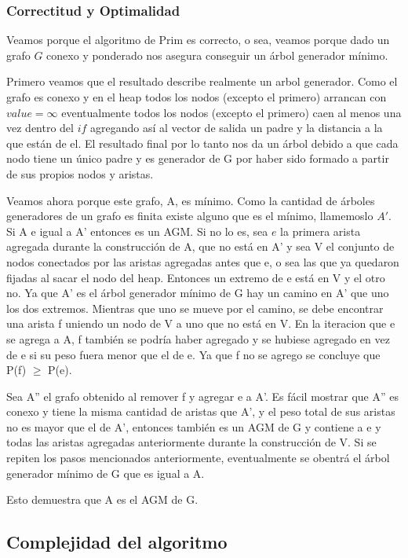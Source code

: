 \subsubsection{Correctitud y Optimalidad}

Veamos porque el algoritmo de Prim es correcto, o sea, veamos porque dado un grafo $G$ conexo y ponderado nos asegura conseguir un árbol generador mínimo.

Primero veamos que el resultado describe realmente un arbol generador. Como el grafo es conexo y en el heap todos los nodos (excepto el primero) arrancan con $value = \infty$  eventualmente todos los nodos (excepto el primero) caen al menos una vez dentro del $if$ agregando así al vector de salida un padre y la distancia a la que están de el. El resultado final por lo tanto nos da un árbol debido a que cada nodo tiene un único padre y es generador de G por haber sido formado a partir de sus propios nodos y aristas.

Veamos ahora porque este grafo, A, es mínimo. Como la cantidad de árboles generadores de un grafo es finita existe alguno que es el mínimo, llamemoslo $A'$. Si A e igual a A' entonces es un AGM. Si no lo es, sea $e$ la primera arista agregada durante la construcción de A, que no está en A' y sea V el conjunto de nodos conectados por las aristas agregadas antes que e, o sea las que ya quedaron fijadas al sacar el nodo del heap. Entonces un extremo de e está en V y el otro no. Ya que A' es el árbol generador mínimo de G hay un camino en A' que uno los dos extremos. Mientras que uno se mueve por el camino, se debe encontrar una arista f uniendo un nodo de V a uno que no está en V. En la iteracion que e se agrega a A, f también se podría haber agregado y se hubiese agregado en vez de e si su peso fuera menor que el de e. Ya que f no se agrego se concluye que P(f) $\geq$ P(e).

Sea A'' el grafo obtenido al remover f y agregar e a A'. Es fácil mostrar que A'' es conexo y tiene la misma cantidad de aristas que A', y el peso total de sus aristas no es mayor que el de A', entonces también es un AGM de G y contiene a e y todas las aristas agregadas anteriormente durante la construcción de V. Si se repiten los pasos mencionados anteriormente, eventualmente se obentrá el árbol generador mínimo de G que es igual a A.

Esto demuestra que A es el AGM de G.

\subsection{Complejidad del algoritmo}

